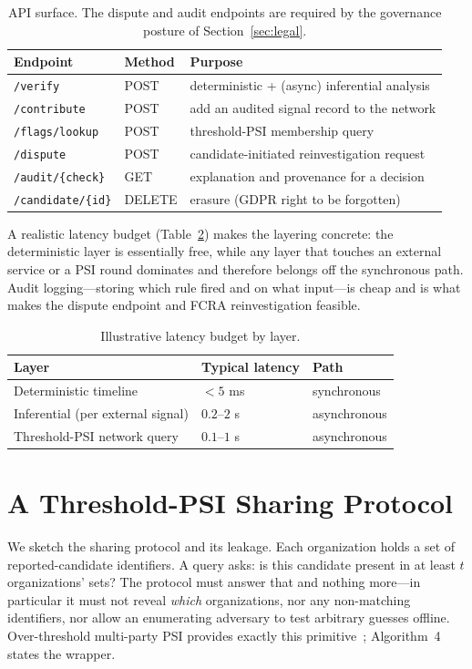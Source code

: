 \documentclass[11pt]{article}
\newcommand{\code}[1]{\texttt{\small #1}}
\begin{document}
\begin{table}[t]\centering\small
\caption{API surface. The dispute and audit endpoints are required by the
governance posture of Section~\ref{sec:legal}.}\label{tab:endpoints}
\begin{tabular}{lll}
\toprule
Endpoint & Method & Purpose\\
\midrule
\code{/verify} & POST & deterministic + (async) inferential analysis\\
\code{/contribute} & POST & add an audited signal record to the network\\
\code{/flags/lookup} & POST & threshold-PSI membership query\\
\code{/dispute} & POST & candidate-initiated reinvestigation request\\
\code{/audit/\{check\}} & GET & explanation and provenance for a decision\\
\code{/candidate/\{id\}} & DELETE & erasure (GDPR right to be forgotten)\\
\bottomrule
\end{tabular}
\end{table}

A realistic latency budget (Table~\ref{tab:latency}) makes the layering concrete:
the deterministic layer is essentially free, while any layer that touches an
external service or a PSI round dominates and therefore belongs off the
synchronous path. Audit logging---storing which rule fired and on what input---is
cheap and is what makes the dispute endpoint and FCRA reinvestigation feasible.

\begin{table}[t]\centering\small
\caption{Illustrative latency budget by layer.}\label{tab:latency}
\begin{tabular}{lll}
\toprule
Layer & Typical latency & Path\\
\midrule
Deterministic timeline & $<5$ ms & synchronous\\
Inferential (per external signal) & $0.2$--$2$ s & asynchronous\\
Threshold-PSI network query & $0.1$--$1$ s & asynchronous\\
\bottomrule
\end{tabular}
\end{table}

\section{A Threshold-PSI Sharing Protocol}\label{sec:protocol}
We sketch the sharing protocol and its leakage. Each organization holds a set of
reported-candidate identifiers. A query asks: is this candidate present in at
least $t$ organizations' sets? The protocol must answer that and nothing
more---in particular it must not reveal \emph{which} organizations, nor any
non-matching identifiers, nor allow an enumerating adversary to test arbitrary
guesses offline. Over-threshold multi-party PSI provides exactly this
primitive~\cite{otpsi2026}; Algorithm~4 states the wrapper.
\end{document}

